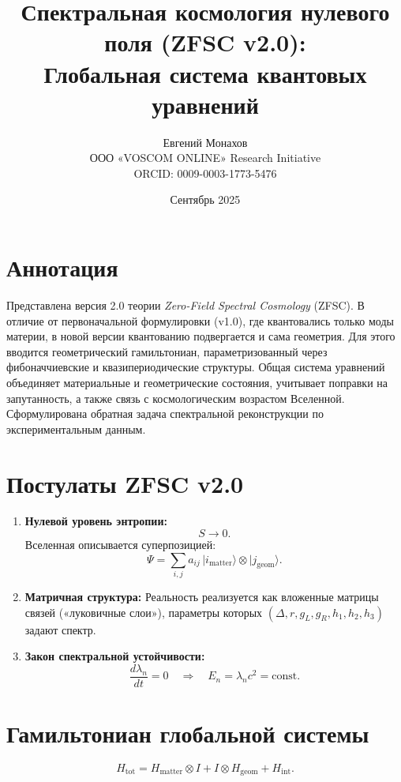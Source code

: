 \documentclass[12pt,a4paper]{article}
\begin{document}
\maketitle

\title{Спектральная космология нулевого поля (ZFSC v2.0): \\ Глобальная система квантовых уравнений}
\author{Евгений Монахов \\ ООО «VOSCOM ONLINE» Research Initiative \\ ORCID: 0009-0003-1773-5476}
\date{Сентябрь 2025}

\section*{Аннотация}
Представлена версия 2.0 теории \emph{Zero-Field Spectral Cosmology} (ZFSC). В отличие от первоначальной формулировки (v1.0), где квантовались только моды материи, в новой версии квантованию подвергается и сама геометрия. Для этого вводится геометрический гамильтониан, параметризованный через фибоначчиевские и квазипериодические структуры. Общая система уравнений объединяет материальные и геометрические состояния, учитывает поправки на запутанность, а также связь с космологическим возрастом Вселенной. Сформулирована обратная задача спектральной реконструкции по экспериментальным данным.

\section{Постулаты ZFSC v2.0}
\begin{enumerate}
    \item \textbf{Нулевой уровень энтропии:}
    \[
    S \to 0.
    \]
    Вселенная описывается суперпозицией:
    \[
    \Psi = \sum_{i,j} a_{ij}\, |i_{\text{matter}}\rangle \otimes |j_{\text{geom}}\rangle .
    \]

    \item \textbf{Матричная структура:}  
    Реальность реализуется как вложенные матрицы связей («луковичные слои»), параметры которых $(\Delta, r, g_L, g_R, h_1,h_2,h_3)$ задают спектр.

    \item \textbf{Закон спектральной устойчивости:}
    \[
    \frac{d \lambda_n}{dt} = 0 \quad \Rightarrow \quad E_n = \lambda_n c^2 = \mathrm{const}.
    \]
\end{enumerate}

\section{Гамильтониан глобальной системы}
\[
H_{\mathrm{tot}} = H_{\mathrm{matter}} \otimes I + I \otimes H_{\mathrm{geom}} + H_{\mathrm{int}}.
\]
\end{document}
